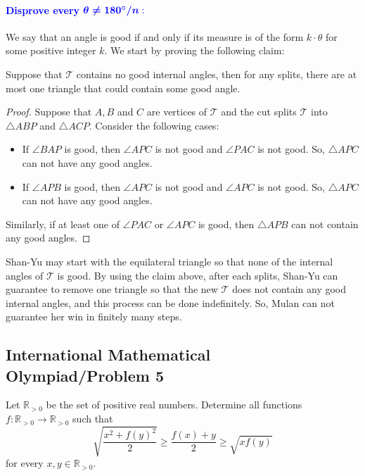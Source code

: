 \documentclass[11pt]{article}
\begin{document}
\paragraph{\textcolor{blue}{Disprove every} $\textcolor{blue}{\boldsymbol{\theta\neq 180^{\circ}/n}:}$}
We say that an angle is good if and only if its measure is of the form $k\cdot \theta$ for some positive integer $k$. We start by proving the following claim:
\begin{claim}
    Suppose that $\mathcal{T}$ contains no good internal angles, then for any splits, there are at most one triangle that could contain some good angle.
\end{claim}
\begin{proof}
    Suppose that $A,B$ and $C$ are vertices of $\mathcal{T}$ and the cut splits $\mathcal{T}$ into $\triangle{ABP}$ and $\triangle{ACP}$. Consider the following cases:
    \begin{itemize}
        \item If $\angle{BAP}$ is good, then $\angle{APC}$ is not good and $\angle{PAC}$ is not good. So, $\triangle{APC}$ can not have any good angles.
        \item If $\angle{APB}$ is good, then $\angle{APC}$ is not good and $\angle{APC}$ is not good. So, $\triangle{APC}$ can not have any good angles.
    \end{itemize}
    Similarly, if at least one of $\angle{PAC}$ or $\angle{APC}$ is good, then $\triangle{APB}$ can not contain any good angles. 
\end{proof}

Shan-Yu may start with the equilateral triangle so that none of the internal angles of $\mathcal{T}$ is good. By using the claim above, after each splits, Shan-Yu can guarantee to remove one triangle so that the new $\mathcal{T}$ does not contain any good internal angles, and this process can be done indefinitely. So, Mulan can not guarantee her win in finitely many steps.
\newpage
\subsection{International Mathematical Olympiad/Problem 5}
\begin{problem*}
    Let $\mathbb{R}_{>0}$ be the set of positive real numbers. Determine all functions $f \colon \mathbb{R}_{>0} \to \mathbb{R}_{>0}$ such that
\[
\sqrt{\frac{x^2 + f(y)^2}{2}} \ge \frac{f(x) + y}{2} \ge \sqrt{x f(y)}
\]
for every $x, y \in \mathbb{R}_{>0}$.
\end{problem*}
\end{document}

